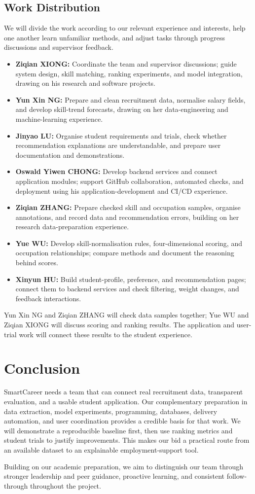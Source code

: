 \documentclass[a4paper,12pt]{article}
\begin{document}
\subsection{Work Distribution}
We will divide the work according to our relevant experience and interests, help one another learn unfamiliar methods, and adjust tasks through progress discussions and supervisor feedback.
\begin{itemize}
  \item \textbf{Ziqian XIONG:} Coordinate the team and supervisor discussions; guide system design, skill matching, ranking experiments, and model integration, drawing on his research and software projects.
  \item \textbf{Yun Xin NG:} Prepare and clean recruitment data, normalise salary fields, and develop skill-trend forecasts, drawing on her data-engineering and machine-learning experience.
  \item \textbf{Jinyao LU:} Organise student requirements and trials, check whether recommendation explanations are understandable, and prepare user documentation and demonstrations.
  \item \textbf{Oswald Yiwen CHONG:} Develop backend services and connect application modules; support GitHub collaboration, automated checks, and deployment using his application-development and CI/CD experience.
  \item \textbf{Ziqian ZHANG:} Prepare checked skill and occupation samples, organise annotations, and record data and recommendation errors, building on her research data-preparation experience.
  \item \textbf{Yue WU:} Develop skill-normalisation rules, four-dimensional scoring, and occupation relationships; compare methods and document the reasoning behind scores.
  \item \textbf{Xinyun HU:} Build student-profile, preference, and recommendation pages; connect them to backend services and check filtering, weight changes, and feedback interactions.
\end{itemize}

Yun Xin NG and Ziqian ZHANG will check data samples together; Yue WU and Ziqian XIONG will discuss scoring and ranking results. The application and user-trial work will connect these results to the student experience.

\clearpage
\section{Conclusion}
SmartCareer needs a team that can connect real recruitment data, transparent evaluation, and a usable student application. Our complementary preparation in data extraction, model experiments, programming, databases, delivery automation, and user coordination provides a credible basis for that work. We will demonstrate a reproducible baseline first, then use ranking metrics and student trials to justify improvements. This makes our bid a practical route from an available dataset to an explainable employment-support tool.

Building on our academic preparation, we aim to distinguish our team through stronger leadership and peer guidance, proactive learning, and consistent follow-through throughout the project.
\end{document}
